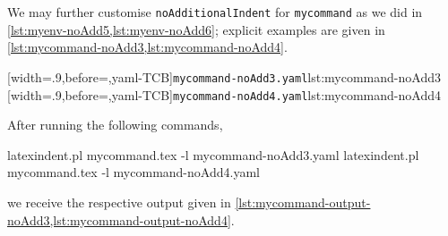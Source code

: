 \documentclass[10pt]{article}
\begin{document}
 \begin{example}
 We may further customise \texttt{noAdditionalIndent} for \texttt{mycommand} as we did in
 \vref{lst:myenv-noAdd5,lst:myenv-noAdd6}; explicit examples are given in
 \cref{lst:mycommand-noAdd3,lst:mycommand-noAdd4}.

 \begin{cmhtcbraster}
  [width=.9\linewidth,before=\centering,yaml-TCB]{\texttt{mycommand-noAdd3.yaml}}{lst:mycommand-noAdd3}
  [width=.9\linewidth,before=\centering,yaml-TCB]{\texttt{mycommand-noAdd4.yaml}}{lst:mycommand-noAdd4}
 \end{cmhtcbraster}

 After running the following commands, 

 \begin{commandshell}
latexindent.pl mycommand.tex -l mycommand-noAdd3.yaml  
latexindent.pl mycommand.tex -l mycommand-noAdd4.yaml  
\end{commandshell}

 we receive the respective output given in
 \cref{lst:mycommand-output-noAdd3,lst:mycommand-output-noAdd4}.

 \begin{cmhtcbraster}
 \end{cmhtcbraster}
 \end{example}
\end{document}

